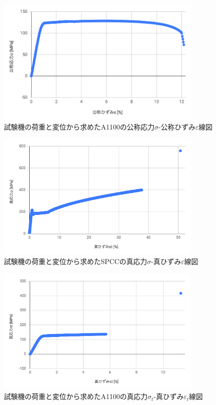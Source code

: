 \documentclass[a4paper,11pt,uplatex]{jsarticle}
\begin{document}
\begin{figure}[H]
      \begin{center}
        \includegraphics[width = 10cm]{画像/A1100公称線図.png}
        \caption{試験機の荷重と変位から求めたA1100の公称応力$\sigma$-公称ひずみ$\varepsilon$線図}
        \label{A1100公称線図}
      \end{center}
\end{figure}

\begin{figure}[H]
      \begin{center}
        \includegraphics[width = 10cm]{画像/真応力.png}
        \caption{試験機の荷重と変位から求めたSPCCの真応力$\sigma$-真ひずみ$\varepsilon$線図}
        \label{SPCC真線図}
      \end{center}
\end{figure}

\begin{figure}[H]
      \begin{center}
        \includegraphics[width = 10cm]{画像/真応力2.png}
        \caption{試験機の荷重と変位から求めたA1100の真応力$\sigma_t$-真ひずみ$\varepsilon_t$線図}
        \label{A1100真線図}
      \end{center}
\end{figure}
\end{document}
